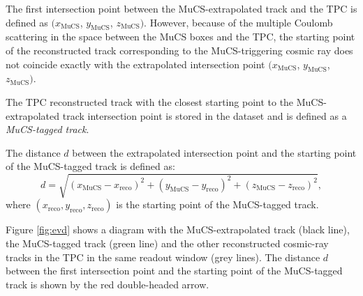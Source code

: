 \documentclass[a4paper,11pt]{article}
\begin{document}
The first intersection point between the MuCS-extrapolated track and the TPC is defined as $(x_{\mathrm{MuCS}}$, $y_{\mathrm{MuCS}}$, $z_{\mathrm{MuCS}})$. However, because of the multiple Coulomb scattering in the space between the MuCS boxes and the TPC, the starting point of the reconstructed track corresponding to the MuCS-triggering cosmic ray does not coincide exactly with the extrapolated intersection point $(x_{\mathrm{MuCS}}$, $y_{\mathrm{MuCS}}$, $z_{\mathrm{MuCS}})$.

The TPC reconstructed track with the closest starting point to the MuCS-extrapolated track intersection point is stored in the dataset and is defined as a \emph{MuCS-tagged track}.

The distance $d$ between the extrapolated intersection point and the starting point of the MuCS-tagged track is defined as:
\begin{equation}\label{eq:d}
d = \sqrt{(x_{\mathrm{MuCS}}-x_{\mathrm{reco}})^2+(y_{\mathrm{MuCS}}-y_{\mathrm{reco}})^2+(z_{\mathrm{MuCS}}-z_{\mathrm{reco}})^2},
\end{equation}
where $(x_{\mathrm{reco}},y_{\mathrm{reco}},z_{\mathrm{reco}})$ is the starting point of the MuCS-tagged track.

Figure \ref{fig:evd} shows a diagram with the MuCS-extrapolated track (black line), the MuCS-tagged track (green line) and the other reconstructed cosmic-ray tracks in the TPC in the same readout window (grey lines). The distance $d$ between the first intersection point and the starting point of the MuCS-tagged track is shown by the red double-headed arrow.
\end{document}
